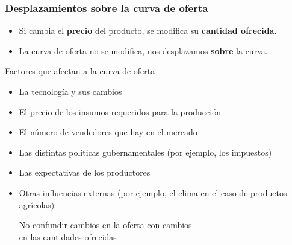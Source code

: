 \documentclass{beamer}
\begin{document}
\begin{frame}
\frametitle{Desplazamientos \textbf{sobre} la curva de oferta}

    \begin{itemize}
        \item Si cambia el \textbf{precio} del producto, se modifica su \textbf{cantidad ofrecida}.
        \item La curva de oferta no se modifica, nos desplazamos \textbf{sobre} la curva.\vspace{1mm}
    \end{itemize}
    \begin{center}
    \end{center}

\end{frame}

\begin{frame}{Factores que afectan a la curva de oferta}
    \begin{itemize}
        \item La tecnología y sus cambios
        \item El precio de los insumos requeridos para la producción
        \item El número de vendedores que hay en el mercado
        \item Las distintas políticas gubernamentales (por ejemplo, los impuestos)
        \item Las expectativas de los productores
        \item Otras influencias externas (por ejemplo, el clima en el caso de productos agrícolas)  

    \begin{boxB}
    \begin{center}
      No confundir cambios en la oferta con cambios \\ en las cantidades ofrecidas
    \end{center}
    \end{boxB}
    \end{itemize}
\end{frame}
\end{document}
